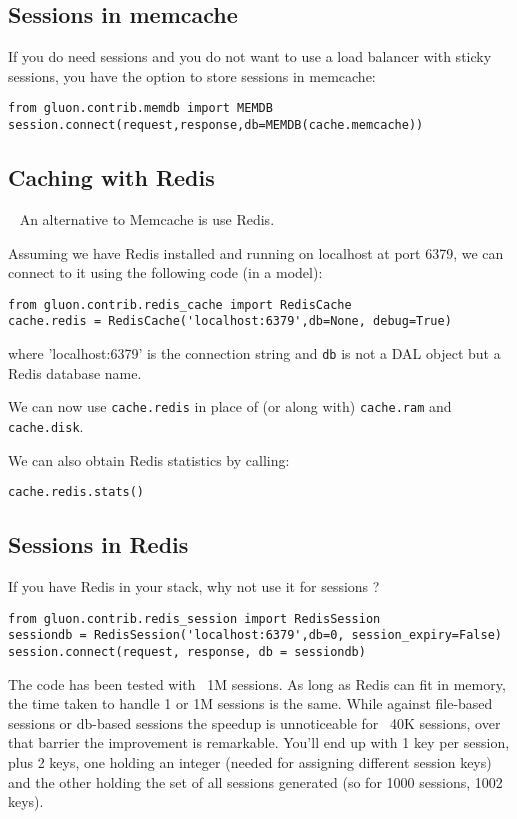 \documentclass[justified,sixbynine,notoc]{tufte-book}
\def\ft{\small\tt}
\def\inxx#1{\index{#1}}
\begin{document}
\begin{fullwidth}
\goodbreak\subsection{Sessions in memcache}

If you do need sessions and you do not want to use a load balancer with sticky sessions, you have the option to store sessions in memcache:
\begin{lstlisting}
from gluon.contrib.memdb import MEMDB
session.connect(request,response,db=MEMDB(cache.memcache))
\end{lstlisting}

\goodbreak\subsection{Caching with Redis}

~\cite{redis}
An alternative to Memcache is use Redis. \inxx{Redis}

Assuming we have Redis installed and running on localhost at port 6379, we can connect to it using the following code (in a model):

\begin{lstlisting}
from gluon.contrib.redis_cache import RedisCache
cache.redis = RedisCache('localhost:6379',db=None, debug=True)
\end{lstlisting}
\noindent where 'localhost:6379' is the connection string and {\ft db} is not a DAL object but a Redis database name.

We can now use {\ft cache.redis} in place of (or along with) {\ft cache.ram} and {\ft cache.disk}.

We can also obtain Redis statistics by calling:

\begin{lstlisting}
cache.redis.stats()
\end{lstlisting}

\goodbreak\subsection{Sessions in Redis}

If you have Redis in your stack, why not use it for sessions ?
\begin{lstlisting}
from gluon.contrib.redis_session import RedisSession
sessiondb = RedisSession('localhost:6379',db=0, session_expiry=False)
session.connect(request, response, db = sessiondb)
\end{lstlisting}
The code has been tested with ~1M sessions. As long as Redis can fit in memory, the time taken to handle
1 or 1M sessions is the same. While against file-based sessions or db-based sessions
the speedup is unnoticeable for ~40K sessions, over that barrier the improvement is remarkable.
You'll end up with 1 key per session, plus 2 keys, one holding an integer (needed for assigning different session keys) and the other holding the set of all
sessions generated (so for 1000 sessions, 1002 keys).


\end{fullwidth}
\end{document}

